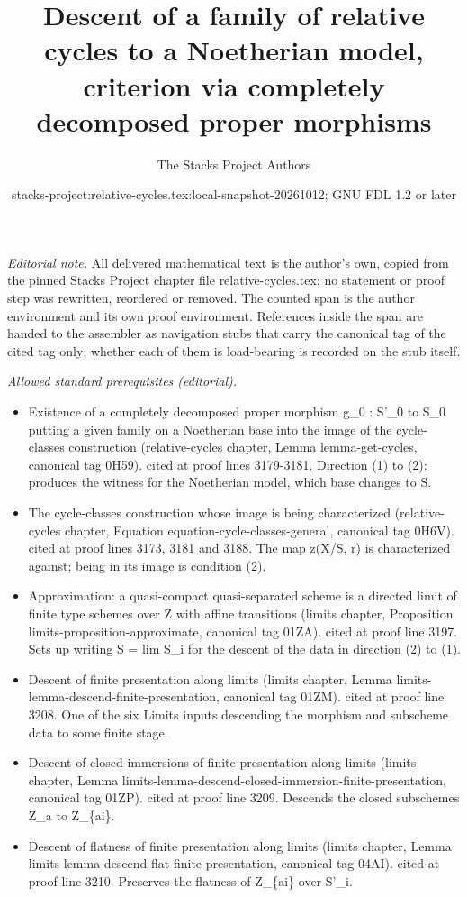 \documentclass{stacks-project}
\title{Descent of a family of relative cycles to a Noetherian model, criterion via completely decomposed proper morphisms}
\author{The Stacks Project Authors}
\date{stacks-project:relative-cycles.tex:local-snapshot-20261012; GNU FDL 1.2 or later}
\theoremstyle{plain}
\theoremstyle{definition}
\theoremstyle{remark}
\numberwithin{equation}{subsection}
\begin{document}
\maketitle
\setcounter{subsection}{1}
\noindent\textit{Editorial note.} All delivered mathematical text is the author's own, copied from the pinned Stacks Project chapter file relative-cycles.tex; no statement or proof step was rewritten, reordered or removed. The counted span is the author environment and its own proof environment. References inside the span are handed to the assembler as navigation stubs that carry the canonical tag of the cited tag only; whether each of them is load-bearing is recorded on the stub itself.\par\medskip
\noindent\textit{Allowed standard prerequisites (editorial).}\begin{itemize}
\item Existence of a completely decomposed proper morphism g\_0 : S'\_0 to S\_0 putting a given family on a Noetherian base into the image of the cycle-classes construction (relative-cycles chapter, Lemma lemma-get-cycles, canonical tag 0H59). cited at proof lines 3179-3181. Direction (1) to (2): produces the witness for the Noetherian model, which base changes to S.
\item The cycle-classes construction whose image is being characterized (relative-cycles chapter, Equation equation-cycle-classes-general, canonical tag 0H6V). cited at proof lines 3173, 3181 and 3188. The map z(X/S, r) is characterized against; being in its image is condition (2).
\item Approximation: a quasi-compact quasi-separated scheme is a directed limit of finite type schemes over Z with affine transitions (limits chapter, Proposition limits-proposition-approximate, canonical tag 01ZA). cited at proof line 3197. Sets up writing S = lim S\_i for the descent of the data in direction (2) to (1).
\item Descent of finite presentation along limits (limits chapter, Lemma limits-lemma-descend-finite-presentation, canonical tag 01ZM). cited at proof line 3208. One of the six Limits inputs descending the morphism and subscheme data to some finite stage.
\item Descent of closed immersions of finite presentation along limits (limits chapter, Lemma limits-lemma-descend-closed-immersion-finite-presentation, canonical tag 01ZP). cited at proof line 3209. Descends the closed subschemes Z\_a to Z\_\{ai\}.
\item Descent of flatness of finite presentation along limits (limits chapter, Lemma limits-lemma-descend-flat-finite-presentation, canonical tag 04AI). cited at proof line 3210. Preserves the flatness of Z\_\{ai\} over S'\_i.

\end{itemize}
\end{document}
